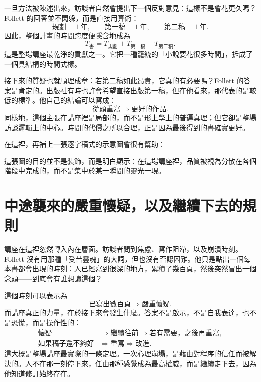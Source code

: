 一旦方法被陳述出來，訪談者自然會提出下一個反對意見：這樣不是會花更久嗎？Follett 的回答並不閃躲，而是直接用算術：
\begin{equation}
\text{規劃} = 1\ \text{年}, \qquad
\text{第一稿} = 1\ \text{年}, \qquad
\text{第二稿} = 1\ \text{年}.
\end{equation}
因此，整個計畫的時間跨度便隱含地成為
\begin{equation}
T_{\text{書}} = T_{\text{規劃}} + T_{\text{第一稿}} + T_{\text{第二稿}}.
\end{equation}
這是整場講座最乾淨的貢獻之一。它把一種籠統的「小說要花很多時間」，拆成了一個具結構的時間式樣。

接下來的質疑也就順理成章：若第二稿如此昂貴，它真的有必要嗎？Follett 的答案是肯定的。出版社有時也許會希望直接出版第一稿，但在他看來，那代表的是較低的標準。他自己的結論可以寫成：
\begin{equation}
\text{從頭重寫} \Rightarrow \text{更好的作品}.
\end{equation}
同樣地，這個主張在講座裡是局部的，而不是形上學上的普遍真理；但它卻是整場訪談邏輯上的中心。時間的代價之所以合理，正是因為最後得到的書確實更好。

在這裡，再補上一張逐字稿式的示意圖會很有幫助：

\begin{figure}[h]
\centering
{}
\end{figure}

這張圖的目的並不是裝飾，而是明白顯示：在這場講座裡，品質被視為分散在各個階段中完成的，而不是集中於某一瞬間的靈光一現。

\section{中途襲來的嚴重懷疑，以及繼續下去的規則}

講座在這裡忽然轉入內在層面。訪談者問到焦慮、寫作阻滯，以及崩潰時刻。Follett 沒有用那種「受苦靈魂」的大詞，但也沒有否認困難。他只是點出一個每本書都會出現的時刻：人已經寫到很深的地方，累積了幾百頁，然後突然冒出一個念頭——到底會有誰想讀這個？

這個時刻可以表示為
\begin{equation}
\text{已寫出數百頁} \Rightarrow \text{嚴重懷疑}.
\end{equation}
而講座真正的力量，在於接下來會發生什麼。答案不是啟示，不是自我表達，也不是恐慌，而是操作性的：
\begin{align}
\text{懷疑} &\Rightarrow \text{繼續往前} \Rightarrow \text{若有需要，之後再重寫},\\
\text{如果稿子還不夠好} &\Rightarrow \text{重寫} \Rightarrow \text{改進}.
\end{align}
這大概是整場講座最實際的一條定理。一次心理崩塌，是藉由對程序的信任而被解決的。人不在那一刻停下來，任由那種感覺成為最高權威，而是繼續走下去，因為他知道修訂始終存在。

